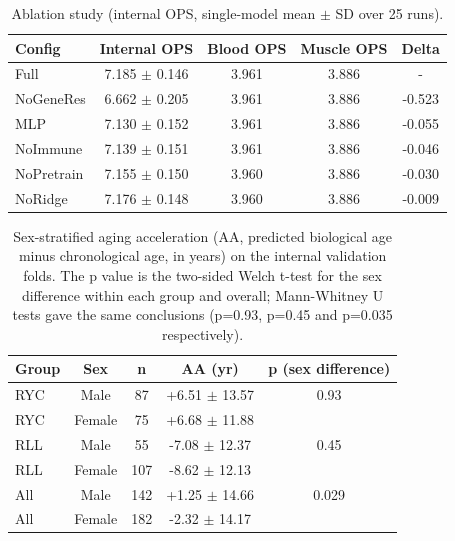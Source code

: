 \documentclass[11pt,a4paper]{article}
\begin{document}
\begin{table}[htbp]
\caption{Ablation study (internal OPS, single-model mean $\pm$ SD over 25 runs).}
\label{tab:ablation}
\begin{center}
\begin{tabular}{lcccc}
\hline
Config & Internal OPS & Blood OPS & Muscle OPS & Delta \\
\hline
Full & 7.185 $\pm$ 0.146 & 3.961 & 3.886 & - \\
NoGeneRes & 6.662 $\pm$ 0.205 & 3.961 & 3.886 & -0.523 \\
MLP & 7.130 $\pm$ 0.152 & 3.961 & 3.886 & -0.055 \\
NoImmune & 7.139 $\pm$ 0.151 & 3.961 & 3.886 & -0.046 \\
NoPretrain & 7.155 $\pm$ 0.150 & 3.960 & 3.886 & -0.030 \\
NoRidge & 7.176 $\pm$ 0.148 & 3.960 & 3.886 & -0.009 \\
\hline
\end{tabular}
\end{center}
\end{table}

\begin{table}[htbp]
\caption{Sex-stratified aging acceleration (AA, predicted biological age minus chronological age, in years) on the internal validation folds. The p value is the two-sided Welch t-test for the sex difference within each group and overall; Mann-Whitney U tests gave the same conclusions (p=0.93, p=0.45 and p=0.035 respectively).}
\label{tab:aasex}
\begin{center}
\begin{tabular}{lcccc}
\hline
Group & Sex & n & AA (yr) & p (sex difference) \\
\hline
RYC & Male & 87 & +6.51 $\pm$ 13.57 & 0.93 \\
RYC & Female & 75 & +6.68 $\pm$ 11.88 & \\
RLL & Male & 55 & -7.08 $\pm$ 12.37 & 0.45 \\
RLL & Female & 107 & -8.62 $\pm$ 12.13 & \\
All & Male & 142 & +1.25 $\pm$ 14.66 & 0.029 \\
All & Female & 182 & -2.32 $\pm$ 14.17 & \\
\hline
\end{tabular}
\end{center}
\end{table}
\end{document}
